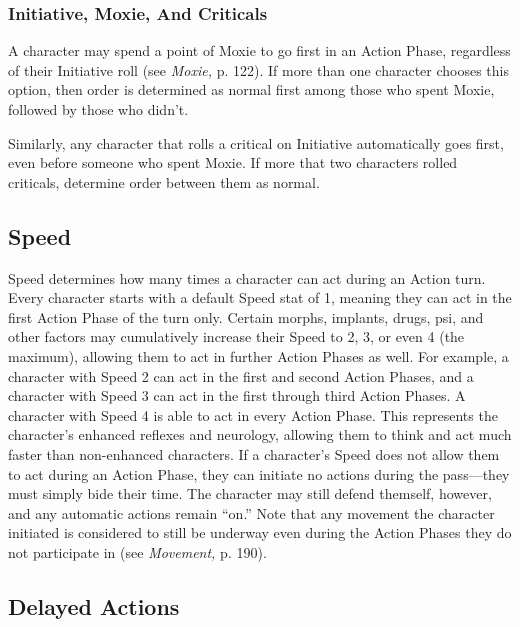 \subsubsection{Initiative, Moxie, And Criticals}

A character may spend a point of Moxie to go first in 
an Action Phase, regardless of their Initiative roll (see 
\textit{Moxie,} p. 122). If more than one character chooses 
this option, then order is determined as normal first 
among those who spent Moxie, followed by those 
who didn't.

Similarly, any character that rolls a critical on Initiative
automatically goes first, even before someone
who spent Moxie. If more that two characters rolled 
criticals, determine order between them as normal.

\subsection{Speed}

Speed determines how many times a character can 
act during an Action turn. Every character starts with 
a default Speed stat of 1, meaning they can act in the 
first Action Phase of the turn only. Certain morphs, 
implants, drugs, psi, and other factors may cumulatively
increase their Speed to 2, 3, or even 4 (the
maximum), allowing them to act in further Action 
Phases as well. For example, a character with Speed 
2 can act in the first and second Action Phases, and 
a character with Speed 3 can act in the first through 
third Action Phases. A character with Speed 4 is 
able to act in every Action Phase. This represents 
the character's enhanced reflexes and neurology, allowing
them to think and act much faster than non-enhanced
characters.
If a character's Speed does not allow them to act 
during an Action Phase, they can initiate no actions 
during the pass—they must simply bide their time. 
The character may still defend themself, however, and 
any automatic actions remain ``on.'' Note that any 
movement the character initiated is considered to still 
be underway even during the Action Phases they do 
not participate in (see \textit{Movement,} p. 190).

\subsection{Delayed Actions}

